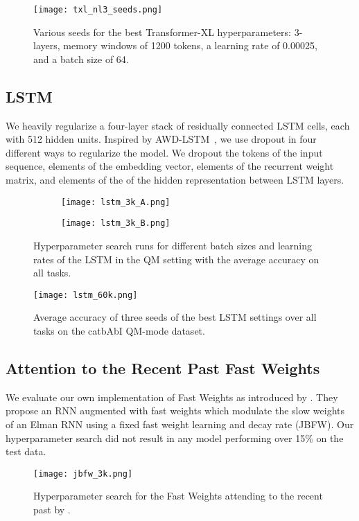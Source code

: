 \documentclass{article} \usepackage{iclr2021_conference,times}
\begin{document}
\begin{figure}[H]
  \centering
  \vspace{-10pt}
  \texttt{[image: txl\_nl3\_seeds.png]}
  \caption{Various seeds for the best Transformer-XL hyperparameters: 3-layers, memory windows of 1200 tokens, a learning rate of 0.00025, and a batch size of 64.}
  \label{appendix:fig:txl_nl3_seeds}
\end{figure}


\subsection{LSTM}
We heavily regularize a four-layer stack of residually connected LSTM cells, each with 512 hidden units. Inspired by AWD-LSTM~\citep{merity2018regularizing}, we use dropout in four different ways to regularize the model. We dropout the tokens of the input sequence, elements of the embedding vector, elements of the recurrent weight matrix, and elements of the of the hidden representation between LSTM layers.
\begin{figure}[H]
  \centering
\begin{subfigure}[b]{.49\linewidth}
    \texttt{[image: lstm\_3k\_A.png]}
  \end{subfigure}
  \begin{subfigure}[b]{.49\linewidth}
    \texttt{[image: lstm\_3k\_B.png]}
  \end{subfigure}
  \caption{Hyperparameter search runs for different batch sizes and learning rates of the LSTM in the QM setting with the average accuracy on all tasks.}
  \label{appendix:fig:lstm3k}
\end{figure}
\begin{figure}[H]
  \centering
\texttt{[image: lstm\_60k.png]}
  \caption{Average accuracy of three seeds of the best LSTM settings over all tasks on the catbAbI QM-mode dataset.}
  \label{appendix:fig:lstm60k}
\end{figure}

\subsection{Attention to the Recent Past Fast Weights}
\label{appendix:sec:jbfw_search}
We evaluate our own implementation of Fast Weights as introduced by \citet{Ba2016using}. They propose an RNN augmented with fast weights which modulate the slow weights of an Elman RNN using a fixed fast weight learning and decay rate (JBFW). Our hyperparameter search did not result in any model performing over 15\% on the test data. 
\begin{figure}[H]
  \centering
\texttt{[image: jbfw\_3k.png]}
  \caption{Hyperparameter search for the Fast Weights attending to the recent past by \citet{Ba2016using}.}
  \label{appendix:fig:jbfw3k}
\end{figure}
\end{document}
